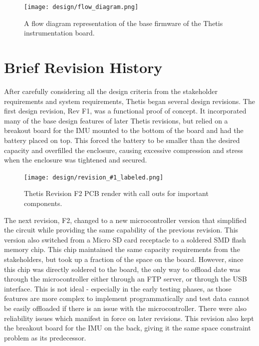 \begin{figure}[h!]
	\centering
	\texttt{[image: design/flow\_diagram.png]}
	\caption[Base Firmware Flow Diagram]{A flow diagram representation of the base firmware of the Thetis instrumentation board.}
\end{figure}

\section{Brief Revision History} 

\newcommand{\revisionfigure}[1]{
    \begin{figure}[H]
		\labfig{thetis_rev_#1}
        \caption{Thetis Revision \uppercase{#1} PCB render with call outs for important components.}
		\centering
		\texttt{[image: design/revision\_\#1\_labeled.png]}
    \end{figure}
}

After carefully considering all the design criteria from the stakeholder requirements and system requirements, Thetis began several design revisions.
The first design revision, Rev F1, was a functional proof of concept.
It incorporated many of the base design features of later Thetis revisions, but relied on a breakout board for the IMU mounted to the bottom of the board and had the battery placed on top.
This forced the battery to be smaller than the desired capacity and overfilled the enclosure, causing excessive compression and stress when the enclosure was tightened and secured.

\revisionfigure{f2}

The next revision, F2, changed to a new microcontroller version that simplified the circuit while providing the same capability of the previous revision.
This version also switched from a Micro SD card receptacle to a soldered SMD flash memory chip.
This chip maintained the same capacity requirements from the stakeholders, but took up a fraction of the space on the board.
However, since this chip was directly soldered to the board, the only way to offload date was through the microcontroller either through an FTP server, or through the USB interface.
This is not ideal - especially in the early testing phases, as those features are more complex to implement programmatically and test data cannot be easily offloaded if there is an issue with the microcontroller.
There were also reliability issues which manifest in force on later revisions.
This revision also kept the breakout board for the IMU on the back, giving it the same space constraint problem as its predecessor.


